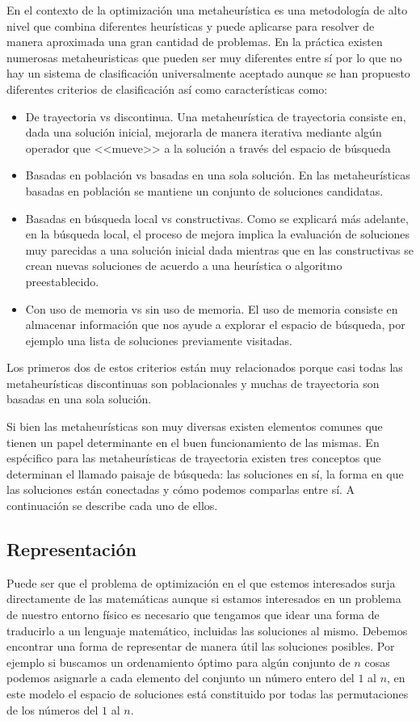 En el contexto de la optimización una metaheurística es una metodología de alto nivel que combina diferentes heurísticas y puede aplicarse para resolver de manera aproximada una gran cantidad de problemas. En la práctica existen numerosas metaheuristicas que pueden ser muy diferentes entre sí por lo que no hay un sistema de clasificación universalmente aceptado aunque se han propuesto diferentes criterios de clasificación \cite{Stegherr2020} así como características como:
\begin{itemize}
\item De trayectoria vs discontinua. Una metaheurística de trayectoria consiste en, dada una solución inicial, mejorarla de manera iterativa mediante algún operador que <<mueve>> a la solución a través del espacio de búsqueda %
\item Basadas en población vs basadas en una sola solución. En las metaheurísticas basadas en población se mantiene un conjunto de soluciones candidatas.
\item Basadas en búsqueda local vs constructivas. Como se explicará más adelante, en la búsqueda local, el proceso de mejora implica la evaluación de soluciones muy parecidas a una solución inicial dada mientras que en las constructivas se crean nuevas soluciones de acuerdo a una heurística o algoritmo preestablecido.
\item Con uso de memoria vs sin uso de memoria. El uso de memoria consiste en almacenar información que nos ayude a explorar el espacio de búsqueda, por ejemplo una lista de soluciones previamente visitadas.
\end{itemize} 
Los primeros dos de estos criterios están muy relacionados porque casi todas las metaheurísticas discontinuas son poblacionales y muchas de trayectoria son basadas en una sola solución.


Si bien las metaheurísticas son muy diversas existen elementos comunes que tienen un papel determinante en el buen funcionamiento de las mismas. En espécifico para las metaheurísticas de trayectoria existen tres conceptos que determinan el llamado paisaje de búsqueda: las soluciones en sí, la forma en que las soluciones están conectadas y cómo podemos comparlas entre sí. A continuación se describe cada uno de ellos.
\subsection{Representación}
Puede ser que el problema de optimización en el que estemos interesados surja directamente de las matemáticas aunque si estamos interesados en un problema de nuestro entorno físico es necesario que tengamos que idear una forma de traducirlo a un lenguaje matemático, incluidas las soluciones al mismo. Debemos encontrar una forma de representar de manera útil las soluciones posibles.
Por ejemplo si buscamos un ordenamiento óptimo para algún conjunto de $n$ cosas podemos asignarle a cada elemento del conjunto un número entero del $1$ al $n$, en este modelo el espacio de soluciones está constituido por todas las permutaciones de los números del $1$ al $n$. 

